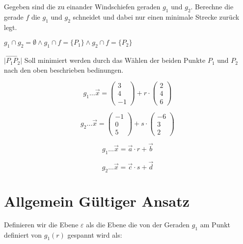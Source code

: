 \documentclass{article}
\begin{document}
Gegeben sind die zu einander Windschiefen geraden \( g_1 \) und  \( g_2 \). Berechne die gerade \( f \) die \( g_1 \) und \( g_2 \) schneidet und dabei nur einen minimale Strecke zurück legt. \newline

\( g_1 \cap g_2 = \emptyset \land g_1 \cap f = \{P_1\} \land g_2 \cap f = \{P_2\}\)

\(  \vert \overrightarrow{ P_1 P_2 } \vert \) Soll minimiert werden durch das Wählen der beiden Punkte \( P_1 \) und \( P_2 \) nach den oben beschrieben bedinungen.


\begin{equation}
	g_1 \dots \overrightarrow{x} = \begin{pmatrix}3\\4\\-1\end{pmatrix} + r \cdot \begin{pmatrix}2\\4\\6\end{pmatrix}
\end{equation}


\begin{equation}
	g_2 \dots \overrightarrow{x} = \begin{pmatrix}-1\\0\\5\end{pmatrix} + s \cdot \begin{pmatrix}-6\\3\\2\end{pmatrix}
\end{equation}

\vspace*{5cm}

\begin{equation}
	g_1 \dots \overrightarrow{x} = \overrightarrow{a} \cdot r +  \overrightarrow{b}
\end{equation}


\begin{equation}
	g_2 \dots \overrightarrow{x} = \overrightarrow{c} \cdot s 
	+ \overrightarrow{d}
\end{equation}

\section*{ Allgemein Gültiger Ansatz }

Definieren wir die Ebene \( \varepsilon \) als die Ebene die von der Geraden \( g_1 \) am Punkt definiert von \( g_1(r) \) gespannt wird als: 
\end{document}
